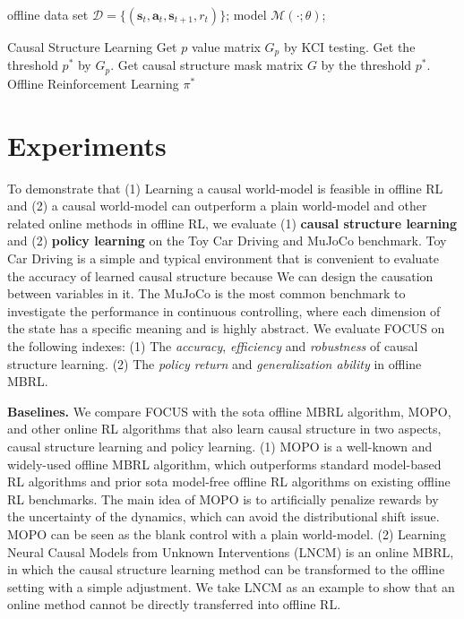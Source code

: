 \documentclass{article}
\theoremstyle{plain}
\theoremstyle{definition}
\theoremstyle{remark}
\begin{document}
\begin{algorithm}[t!]
  \caption{Causal Model Framework for Offline MBRL}
  \label{alg-model}
\begin{algorithmic}
   offline data set $\mathcal{D}=\{(\textbf{s}_t,\textbf{a}_t,\textbf{s}_{t+1},r_t)\}$;
  model $\mathcal{M}(\cdot;\theta)$;
  
   Causal Structure Learning
  \STATE Get $p$ value matrix $G_{p}$ by KCI testing.
  \STATE Get the threshold $p^*$ by $G_{p}$.
  \STATE Get causal structure mask matrix $G$ by the threshold $p^*$.
   Offline Reinforcement Learning
   $\pi^*$
\end{algorithmic}
\end{algorithm}

\section{Experiments}

To demonstrate that 
(1) Learning a causal world-model is feasible in offline RL 
and (2) a causal world-model can outperform a plain world-model and other related online methods in offline RL, we evaluate (1) \textbf{causal structure learning} and (2) \textbf{policy learning} on the Toy Car Driving and MuJoCo benchmark.
Toy Car Driving is a simple and typical environment that is convenient to evaluate the accuracy of learned causal structure because We can design the causation between variables in it.
The MuJoCo is the most common benchmark to investigate the performance in continuous controlling, where each dimension of the state has a specific meaning and is highly abstract.
We evaluate FOCUS on the following indexes: 
(1) The \textit{accuracy}, \textit{efficiency} and \textit{robustness} of causal structure learning.
(2) The \textit{policy return} and \textit{generalization ability} in offline MBRL.

\textbf{Baselines.} 
We compare FOCUS with the sota offline MBRL algorithm, MOPO, and other online RL algorithms that also learn causal structure in two aspects, causal structure learning and policy learning.
(1) MOPO \cite{mopo} is a well-known and widely-used offline MBRL algorithm, which outperforms standard model-based RL algorithms and prior sota model-free offline RL algorithms on existing offline RL benchmarks.
The main idea of MOPO is to artificially penalize rewards by the uncertainty of the dynamics, which can avoid the distributional shift issue.
MOPO can be seen as the blank control with a plain world-model.
(2) Learning Neural Causal Models from Unknown Interventions (LNCM) \cite{DBLP:journals/corr/abs-1910-01075} is an online MBRL, in which the causal structure learning method can be transformed to the offline setting with a simple adjustment.
We take LNCM as an example to show that an online method cannot be directly transferred into offline RL.
\end{document}
